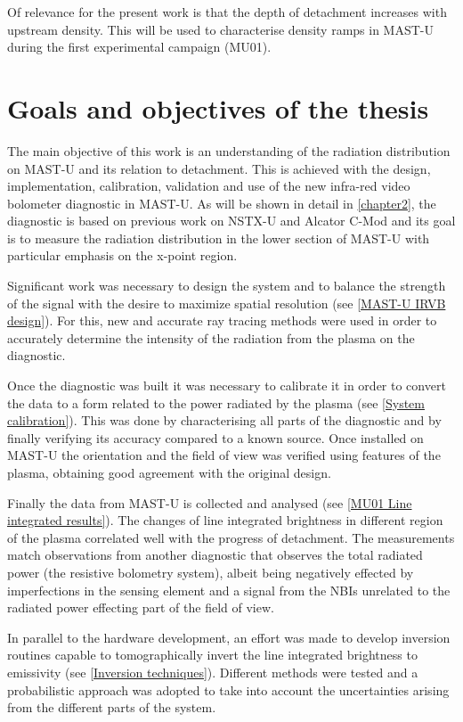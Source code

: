Of relevance for the present work is that the depth of detachment increases with upstream density. This will be used to characterise density ramps in MAST-U during the first experimental campaign (MU01).

\section{Goals and objectives of the thesis}

The main objective of this work is an understanding of the radiation distribution on MAST-U and its relation to detachment. This is achieved with the design, implementation, calibration, validation and use of  the new infra-red video bolometer diagnostic in MAST-U. As will be shown in detail in \autoref{chapter2}, the diagnostic is based on previous work on NSTX-U\cite{VanEden2016} and Alcator C-Mod\cite{Reinke2018a} and its goal is to measure the radiation distribution in the lower section of MAST-U with particular emphasis on the x-point region.

Significant work was necessary to design the system and to balance the strength of the signal with the desire to maximize spatial resolution (see \autoref{MAST-U IRVB design}). For this, new and accurate ray tracing methods were used in order to accurately determine the intensity of the radiation from the plasma on the diagnostic.

Once the diagnostic was built it was necessary to calibrate it in order to convert the data to a form related to the power radiated by the plasma (see \autoref{System calibration}). This was done by characterising all parts of the diagnostic and by finally verifying its accuracy compared to a known source. Once installed on MAST-U the orientation and the field of view was verified using features of the plasma, obtaining good agreement with the original design.

Finally the data from MAST-U is collected and analysed (see \autoref{MU01 Line integrated results}). The changes of line integrated brightness in different region of the plasma correlated well with the progress of detachment. The measurements match observations from another diagnostic that observes the total radiated power (the resistive bolometry system), albeit being negatively effected by imperfections in the sensing element and a signal from the NBIs unrelated to the radiated power effecting part of the field of view.

In parallel to the hardware development, an effort was made to develop inversion routines capable to tomographically invert the line integrated brightness to emissivity (see \autoref{Inversion techniques}). Different methods were tested and a probabilistic approach was adopted to take into account the uncertainties arising from the different parts of the system.

